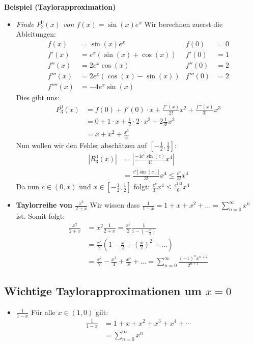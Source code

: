 \documentclass[25pt]{sciposter}
\begin{document}
\begin{multicols}{3}
\textbf{Beispiel (Taylorapproximation)}
\begin{itemize}
	\item \textit{Finde $P_3 ^0 (x)$ von $f(x) = \sin(x)e^x$} Wir berechnen zuerst die Ableitungen:
	\begin{align*}
	    f(x) &= \sin(x)e^x & f(0) &= 0\\
		f'(x) &= e^x (\sin(x) + \cos(x)) & f'(0) &= 1\\
		f''(x) &= 2e^x \cos(x) & f''(0) &= 2\\
		f'''(x) &= 2e^x (\cos(x) - \sin(x)) & f'''(0) &=2 \\
		f''''(x) &= -4e^x\sin(x)
	\end{align*} 
	Dies gibt uns: 
	\begin{align*}
		P_3 ^0 (x) &= f(0) + f'(0)\cdot x + \frac{f''(x)}{2!} x^2 + \frac{f'''(x)}{3!}x^3\\
		&= 0 + 1 \cdot x + \frac{1}{2} \cdot 2 \cdot x^2 + 2 \frac{1}{3!}x^3\\
		&= x + x^2 + \frac{x^3}{3}
	\end{align*}
	Nun wollen wir den Fehler abschätzen auf $[-\frac{1}{2},\frac{1}{2}]$:
	\begin{align*}
		|R_3 ^0 (x)| &= \left| \frac{-4e^c \sin(c)}{4!} x^4\right|\\
		&= \frac{e^c |\sin(c)|}{3!} x^4 \leq \frac{e^c}{3!} x^4
	\end{align*}
	Da nun $c \in (0,x)$ und $x \in [-\frac{1}{2}, \frac{1}{2}]$ folgt: $\frac{e^c}{3!} x^4 \leq \frac{e^{1/2}}{6}x^4$
	\item \textbf{Taylorreihe von $\frac{x^2}{2+x}$} Wir wissen dass $\frac{1}{1-x} = 1 + x + x^2 + \ldots = \sum_{n=0}^{\infty} x^n$ ist. Somit folgt:
	\begin{align*}
		\frac{x^2}{2+x} &= x^2 \frac{1}{2+x} = \frac{x^2}{2} \frac{1}{1 - (-\frac{x}{2})} \\
		&= \frac{x^2}{2} \left( 1 - \frac{x}{2} + \left(\frac{x}{2}\right)^2+ \ldots \right)\\
		&= \frac{x^2}{2} - \frac{x^3}{4} + \frac{x^4}{8} + \ldots = \sum_{n=0}^{\infty} \frac{(-1)^n x^{n+2}}{2^{n+1}}
	\end{align*}
\end{itemize}



\subsection*{Wichtige Taylorapproximationen um $x=0$}
\begin{itemize}
	\item $\boxed{\frac{1}{1-x}}$ Für alle $x \in (1,0)$ gilt:
	\begin{align*}
	{\frac{1}{1-x}} &= 1 + x + x^2 + x^3 + x^4 + \cdots \\
	&= \sum_{n=0}^{\infty} x^n
	\end{align*}	
	

\end{itemize}
\end{multicols}
\end{document}
